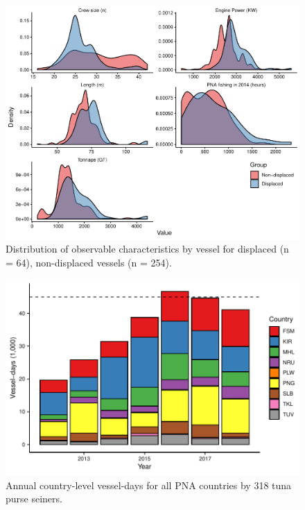 \documentclass[12pt]{article}
\begin{document}
\begin{figure}
\centering
\includegraphics{img/balance_density_plot.pdf}
\caption{\label{fig:balance_density_plot}Distribution of observable characteristics by vessel for displaced (n = 64), non-displaced vessels (n = 254).}
\end{figure}

\begin{figure}
\centering
	\includegraphics{img/all_PS_VDS_cty_year.pdf}
	\caption{\label{fig:all_PS_VDS_cty_year}Annual country-level vessel-days for all PNA countries by 318 tuna purse seiners.}
\end{figure}
\end{document}
